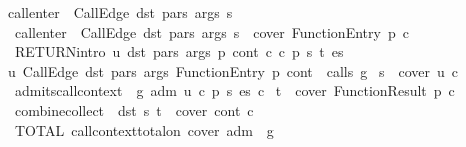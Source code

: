 \begin{isabelle}
\isaindent{\ \ \ \ \ \ \ \ \ \ \ \ \ \ }\isacharparenleft{}call\isacharunderscore{}enter\ {\isasymG}\ \isacharparenleft{}CallEdge\ dst\ pars\ args\isacharparenright{}\ s\isacharparenright{}\isanewline
\isaindent{\ \ \ \ \ \ \ \ }{\isasymLongrightarrow}\ call\isacharunderscore{}enter\ {\isasymG}\ \isacharparenleft{}CallEdge\ dst\ pars\ args\isacharparenright{}\ s\ {\isasymin}\ cover\ \isacharparenleft{}FunctionEntry\ p\isacharparenright{}\ c\isacharprime{}\isachardoublequote{}\isanewline
\isaindent{\ \ \ \ }\ RETURN\isacharbrackleft{}intro\isacharbrackright{}\isacharcolon{}\ \isachardoublequote{}{\isasymAnd}u\ dst\ pars\ args\ p\ cont\ c\ c\isacharprime{}\ p\isacharprime{}\ s\ t\ es\isachardot{}\isanewline
\isaindent{\ \ \ \ \ \ \ \ }\isacharparenleft{}u\isacharcomma{}\ CallEdge\ dst\ pars\ args\isacharcomma{}\ FunctionEntry\ p\isacharcomma{}\ cont\isacharparenright{}\ {\isasymin}\ calls\ g\isanewline
\isaindent{\ \ \ \ \ \ \ \ }{\isasymLongrightarrow}\ s\ {\isasymin}\ cover\ u\ c\isanewline
\isaindent{\ \ \ \ \ \ \ \ }{\isasymLongrightarrow}\ admits\isacharunderscore{}call\isacharunderscore{}context\ {\isasymG}\ g\ adm\ u\ c\ p\isacharprime{}\ s\ es\ c\isacharprime{}\isanewline
\isaindent{\ \ \ \ \ \ \ \ }{\isasymLongrightarrow}\ t\ {\isasymin}\ cover\ \isacharparenleft{}FunctionResult\ p\isacharparenright{}\ c\isacharprime{}\isanewline
\isaindent{\ \ \ \ \ \ \ \ }{\isasymLongrightarrow}\ combine\isacharunderscore{}collect\ {\isasymG}\ dst\ s\ t\ {\isasymin}\ cover\ cont\ c\isachardoublequote{}\isanewline
\isaindent{\ \ \ \ }\ TOTAL\isacharcolon{}\ \isachardoublequote{}call\isacharunderscore{}context\isacharunderscore{}total\isacharunderscore{}on\ cover\ adm\ {\isasymG}\ g\isachardoublequote{}
\end{isabelle}
